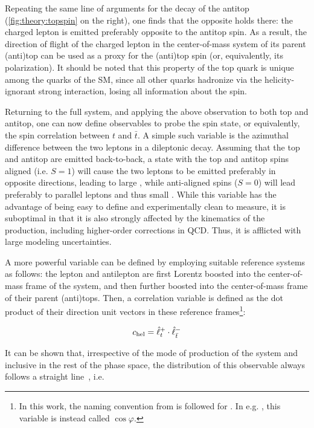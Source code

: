 Repeating the same line of arguments for the decay of the antitop (\cref{fig:theory:topspin} on the right), one finds that the opposite holds there: the charged lepton is emitted preferably opposite to the antitop spin. As a result, the direction of flight of the charged lepton in the center-of-mass system of its parent (anti)top can be used as a proxy for the (anti)top spin (or, equivalently, its polarization). It should be noted that this property of the top quark is unique among the quarks of the SM, since all other quarks hadronize via the helicity-ignorant strong interaction, losing all information about the spin.

Returning to the full \ttbar system, and applying the above observation to both top and antitop, one can now define observables to probe the \ttbar spin state, or equivalently, the spin correlation between $t$ and $\bar{t}$. A simple such variable is the azimuthal difference \dphill between the two leptons in a dileptonic decay. Assuming that the top and antitop are emitted back-to-back, a state with the top and antitop spins aligned (i.e. $S=1$) will cause the two leptons to be emitted preferably in opposite directions, leading to large \dphill, while anti-aligned spins ($S=0$) will lead preferably to parallel leptons and thus small \dphill. While this variable has the advantage of being easy to define and experimentally clean to measure, it is suboptimal in that it is also strongly affected by the kinematics of the \ttbar production, including higher-order corrections in QCD. Thus, it is afflicted with large modeling uncertainties.

A more powerful variable can be defined by employing suitable reference systems as follows: the lepton and antilepton are first Lorentz boosted into the center-of-mass frame of the \ttbar system, and then further boosted into the center-of-mass frame of their parent (anti)tops. Then, a correlation variable \chel is defined as the dot product of their direction unit vectors in these reference frames\footnote{
In this work, the naming convention from  is followed for \chel. In e.g. , this variable is instead called $\cos \varphi$.
}:

\begin{equation}
\label{eq:theory:cheldef}
    c_{\mathrm{hel}} = \hat{\ell}^+_{t} \cdot \hat{\ell}^-_{\bar{t}} 
\end{equation}

It can be shown that, irrespective of the mode of production of the \ttbar system and inclusive in the rest of the phase space, the distribution of this observable always follows a straight line~\cite{Bernreuther:2004jv}, i.e.

